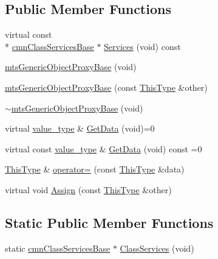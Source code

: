 \subsection*{Public Member Functions}
\begin{DoxyCompactItemize}
\item 
virtual const \\*
\hyperlink{classcmn_class_services_base}{cmn\-Class\-Services\-Base} $\ast$ \hyperlink{classmts_generic_object_proxy_base_a668f4395140c372201eb656664d4bfc3}{Services} (void) const 
\item 
\hyperlink{classmts_generic_object_proxy_base_aa831f498493fffb7f885a0ab0f2241dd}{mts\-Generic\-Object\-Proxy\-Base} (void)
\item 
\hyperlink{classmts_generic_object_proxy_base_aca3fa6198627eec09b0658a2e4d3a8a3}{mts\-Generic\-Object\-Proxy\-Base} (const \hyperlink{classmts_generic_object_proxy_base_adfa837044848485e7241e56816a74083}{This\-Type} \&other)
\item 
\hyperlink{classmts_generic_object_proxy_base_af159cf4b9332116312b0021396a8bf7f}{$\sim$mts\-Generic\-Object\-Proxy\-Base} (void)
\item 
virtual \hyperlink{classmts_generic_object_proxy_base_a82246d737da0e0bfb1710f63f6afa34b}{value\-\_\-type} \& \hyperlink{classmts_generic_object_proxy_base_a9d51847ed0c04af750b39c0d90945747}{Get\-Data} (void)=0
\item 
virtual const \hyperlink{classmts_generic_object_proxy_base_a82246d737da0e0bfb1710f63f6afa34b}{value\-\_\-type} \& \hyperlink{classmts_generic_object_proxy_base_a85594c5fb042f7b0432667893e745aa7}{Get\-Data} (void) const =0
\item 
\hyperlink{classmts_generic_object_proxy_base_adfa837044848485e7241e56816a74083}{This\-Type} \& \hyperlink{classmts_generic_object_proxy_base_a195e1cff25b666f995ca1e65df92b93e}{operator=} (const \hyperlink{classmts_generic_object_proxy_base_adfa837044848485e7241e56816a74083}{This\-Type} \&data)
\item 
virtual void \hyperlink{classmts_generic_object_proxy_base_a3bcbb45ef582c5bed7206d8752fa7a4a}{Assign} (const \hyperlink{classmts_generic_object_proxy_base_adfa837044848485e7241e56816a74083}{This\-Type} \&other)
\end{DoxyCompactItemize}
\subsection*{Static Public Member Functions}
\begin{DoxyCompactItemize}
\item 
static \hyperlink{classcmn_class_services_base}{cmn\-Class\-Services\-Base} $\ast$ \hyperlink{classmts_generic_object_proxy_base_a111e3d881829cbc1d2efc5feaf894aae}{Class\-Services} (void)
\end{DoxyCompactItemize}


